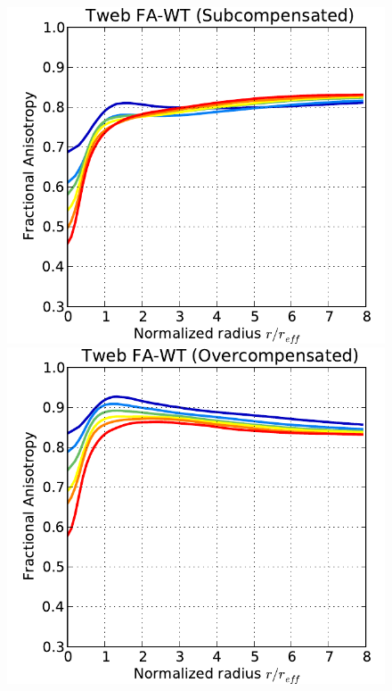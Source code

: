 \documentclass[a4,useAMS,usenatbib,usegraphicx]{mn2e}
\begin{document}
\begin{figure}
\centering  
  \includegraphics[trim = 1mm 0mm 5mm 0mm, clip, keepaspectratio=true,
  width=0.32\textheight]{voids_FA_TwebFAG0.pdf}
  \includegraphics[trim = 1mm 0mm 5mm 0mm, clip, keepaspectratio=true,
  width=0.32\textheight]{voids_FA_TwebFAG1.pdf}

\end{figure}
\end{document}

